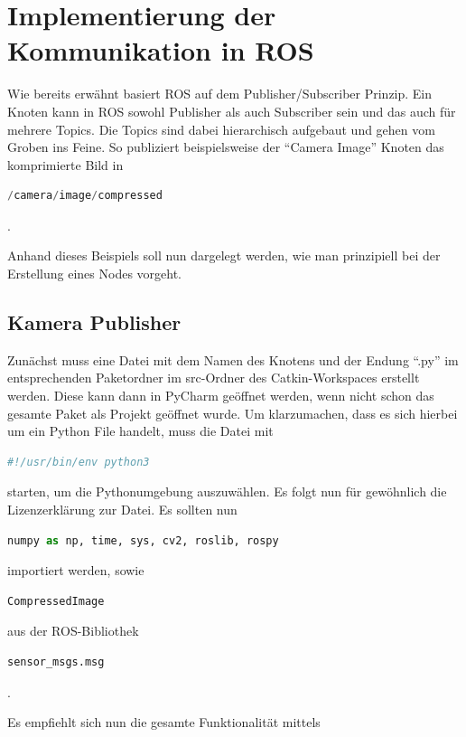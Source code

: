 \section{Implementierung der Kommunikation in ROS}
Wie bereits erwähnt basiert ROS auf dem Publisher/Subscriber Prinzip. Ein Knoten kann in ROS sowohl Publisher als auch Subscriber sein und das auch für mehrere Topics. Die Topics sind dabei hierarchisch aufgebaut und gehen vom Groben ins Feine. So publiziert beispielsweise der ``Camera Image'' Knoten das komprimierte Bild in 

\begin{lstlisting}[language=Python]
/camera/image/compressed
\end{lstlisting}. 

Anhand dieses Beispiels soll nun dargelegt werden, wie man prinzipiell bei der Erstellung eines Nodes vorgeht.


\subsection{Kamera Publisher}
Zunächst muss eine Datei mit dem Namen des Knotens und der Endung ``.py'' im entsprechenden Paketordner im src-Ordner des Catkin-Workspaces erstellt werden. Diese kann dann in PyCharm geöffnet werden, wenn nicht schon das gesamte Paket als Projekt geöffnet wurde.
Um klarzumachen, dass es sich hierbei um ein Python File handelt, muss die Datei mit 


\begin{lstlisting}[language=Python]
#!/usr/bin/env python3
\end{lstlisting}

starten, um die Pythonumgebung auszuwählen. Es folgt nun für gewöhnlich die Lizenzerklärung zur Datei. Es sollten nun 

\begin{lstlisting}[language=Python]
numpy as np, time, sys, cv2, roslib, rospy
\end{lstlisting}

importiert werden, sowie 

\begin{lstlisting}[language=Python]
CompressedImage
\end{lstlisting}aus der ROS-Bibliothek 

\begin{lstlisting}[language=Python]
sensor_msgs.msg
\end{lstlisting}. 

Es empfiehlt sich nun die gesamte Funktionalität mittels 

